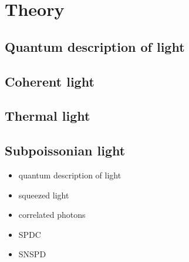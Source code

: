 \section{Theory}
\subsection{Quantum description of light}
\subsection{Coherent light}
\subsection{Thermal light}
\subsection{Subpoissonian light}
\begin{itemize}
    \item quantum description of light
    \item squeezed light
    \item correlated photons
    \item SPDC
    \item SNSPD
\end{itemize}

